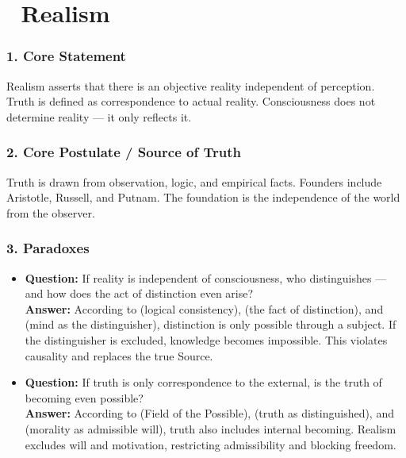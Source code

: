 \documentclass[12pt]{article}
\begin{document}
\section*{🔷 Realism}

\subsubsection*{1. Core Statement}

Realism asserts that there is an objective reality independent of perception. Truth is defined as correspondence to actual reality. Consciousness does not determine reality — it only reflects it.

\subsubsection*{2. Core Postulate / Source of Truth}

Truth is drawn from observation, logic, and empirical facts. Founders include Aristotle, Russell, and Putnam. The foundation is the independence of the world from the observer.

\subsubsection*{3. Paradoxes}

\begin{itemize}
\item \textbf{Question:} If reality is independent of consciousness, who distinguishes — and how does the act of distinction even arise?  
\\ \textbf{Answer:} According to \text{[11.1]} (logical consistency), \text{[11.2]} (the fact of distinction), and \text{[10.2]} (mind as the distinguisher), distinction is only possible through a subject. If the distinguisher is excluded, knowledge becomes impossible. This violates causality and replaces the true Source.

\item \textbf{Question:} If truth is only correspondence to the external, is the truth of becoming even possible?  
\\ \textbf{Answer:} According to \text{[4]} (Field of the Possible), \text{[11.2]} (truth as distinguished), and \text{[11.4]} (morality as admissible will), truth also includes internal becoming. Realism excludes will and motivation, restricting admissibility and blocking freedom.
\end{itemize}
\end{document}
